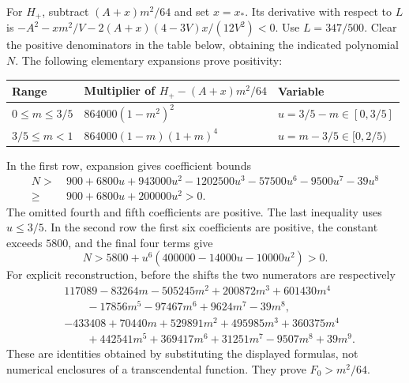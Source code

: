 \documentclass[11pt]{article}
\numberwithin{equation}{section}
\begin{document}
For $H_+$, subtract $(A+x)m^2/64$ and set $x=x_*$. Its derivative with respect to $L$ is
$-A^2-xm^2/V-2(A+x)(4-3V)x/(12V^2)<0$.
Use $L=347/500$. Clear the positive denominators in the table below, obtaining the indicated polynomial $N$. The following elementary expansions prove positivity:
\begin{center}\small
\begin{tabular}{@{}lll@{}}\toprule
Range & Multiplier of $H_+-(A+x)m^2/64$ & Variable\\\midrule
$0\le m\le3/5$ & $864000(1-m^2)^2$ & $u=3/5-m\in[0,3/5]$\\
$3/5\le m<1$ & $864000(1-m)(1+m)^4$ & $u=m-3/5\in[0,2/5)$\\\bottomrule
\end{tabular}
\end{center}
In the first row, expansion gives coefficient bounds
\begin{align*}
 N>&\ 900+6800u+943000u^2-1202500u^3
       -57500u^6-9500u^7-39u^8\\
  \ge&\ 900+6800u+200000u^2>0.
\end{align*}
The omitted fourth and fifth coefficients are positive. The last inequality uses $u\le3/5$. In the second row the first six coefficients are positive, the constant exceeds $5800$, and the final four terms give
\[
 N>5800+u^6(400000-14000u-10000u^2)>0.
\]
For explicit reconstruction, before the shifts the two numerators are respectively
\begin{align*}
 &117089-83264m-505245m^2+200872m^3+601430m^4
 \\ &\qquad -17856m^5-97467m^6+9624m^7-39m^8,\\[2pt]
 &-433408+70440m+529891m^2+495985m^3+360375m^4
 \\ &\qquad +442541m^5+369417m^6+31251m^7-9507m^8+39m^9.
\end{align*}
These are identities obtained by substituting the displayed formulas, not numerical enclosures of a transcendental function. They prove $F_0>m^2/64$.
\end{document}
